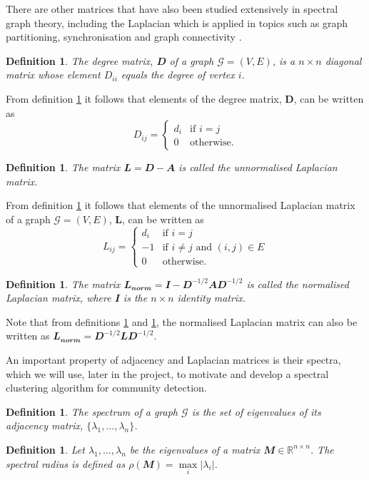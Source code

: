 \documentclass[12pt]{article}
\numberwithin{equation}{section}
\newtheorem{definition}[theorem]{Definition}
\newcommand*\abs[1]{\left\vert#1\right\vert}
\begin{document}
There are other matrices that have also been studied extensively in spectral graph theory, including the Laplacian which is applied in topics such as graph partitioning, synchronisation and graph connectivity \cite{For10}.
\begin{definition}
\label{def:degreeMatrix}
	The degree matrix, $\mathbfit{D}$ of a graph $\mathcal{G} = (V,E)$, is a $n \times n$ diagonal matrix whose element $D_{ii}$ equals the degree of vertex $i$.
\end{definition}
From definition \ref{def:degreeMatrix} it follows that elements of the degree matrix, $\mathbf{D}$, can be written as
\begin{equation*}
	 D_{ij} =
	\begin{cases}
		d_{i} & \text{if } i = j\\
		0 & \text{otherwise}.
	\end{cases}
\end{equation*}
\begin{definition}
\label{def:unnormalisedLaplacianMatrix}
	The matrix $\mathbfit{L} = \mathbfit{D}  - \mathbfit{A} $ is called the unnormalised Laplacian matrix.
\end{definition}
From definition \ref{def:unnormalisedLaplacianMatrix} it follows that elements of the unnormalised Laplacian matrix of a graph $\mathcal{G} = (V,E)$, $\mathbf{L}$, can be written as
\begin{equation*}
	L_{ij} =
	\begin{cases}
		d_{i} & \text{if } i = j\\
		-1 & \text{if } i \neq j \text{ and }  (i,j) \in E\\
		0 & \text{otherwise}.
	\end{cases}
\end{equation*}
\begin{definition}
\label{def:normalisedLaplacianMatrix}
	The matrix $\mathbfit{L_{norm}} = \mathbfit{I}  - \mathbfit{D}^{-1/2}\mathbfit{A}\mathbfit{D}^{-1/2}$ is called the normalised Laplacian matrix, where $\mathbfit{I}$ is the $n \times n$ identity matrix.
\end{definition}
Note that from definitions \ref{def:unnormalisedLaplacianMatrix} and \ref{def:normalisedLaplacianMatrix}, the normalised Laplacian matrix can also be written as $\mathbfit{L_{norm}} = \mathbfit{D}^{-1/2}\mathbfit{L}\mathbfit{D}^{-1/2}$.

An important property of adjacency and Laplacian matrices is their spectra, which we will use, later in the project, to motivate and develop a spectral clustering algorithm for community detection.
\begin{definition}
\label{def:spectrum}
	The spectrum of a graph $\mathcal{G}$ is the set of eigenvalues of its adjacency matrix, $\{\lambda_{1},\dots,\lambda_{n}\}$.
\end{definition}
\begin{definition}
\label{def:spectralRadius}
	Let $\lambda_{1},\dots,\lambda_{n}$ be the eigenvalues of a matrix $\mathbfit{M} \in \mathbb{R}^{n \times n}$. The spectral radius is defined as $\rho(\mathbfit{M}) = \max\limits_{i} \abs{\lambda_{i}}$.
\end{definition}
\end{document}
